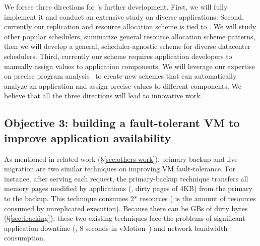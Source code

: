 
 We forsee three directions for \tripod's further 
development. First, we will fully implement it and conduct an extensive study 
on diverse applications. Second, currently our replication and resource 
allocation scheme is tied to \mesos. We will study other popular schedulers, 
summarize general resource allocation scheme patterns, then we will develop a 
general, scheduler-agnostic scheme for diverse datacenter schedulers. Third, 
currently our scheme requires application developers to manually assign  
values to application components. We will leverage our expertise on precise 
program analysis~\cite{peregrine:sosp11,woodpecker:asplos13} to create new 
schemes that can automatically analyze an application and assign precise  
values to different components. We believe that all the three directions will 
lead to innovative work.

\vspace{-.15in}\subsection{Objective 3: building a fault-tolerant VM to improve 
application availability}\label{sec:vm}\vspace{-.075in}



As mentioned in related work (\S\ref{sec:others-work}), primary-backup and live 
migration are two similar techniques on improving VM fault-tolerance. For 
instance, after serving each request, the primary-backup technique transfers all 
memory pages modified by applications (\ie, dirty pages of 4KB) from the 
primary to the backup. This technique consumes 2* resources ( is 
the amount of resources consumed by unreplicated execution). Because there can 
be GBs of dirty bytes (\S\ref{sec:tracking}), these two existing techniques 
face the problems of significant application downtime (\eg, 8 seconds in 
vMotion~\cite{vmotion:atc05}) and network bandwidth consumption.

